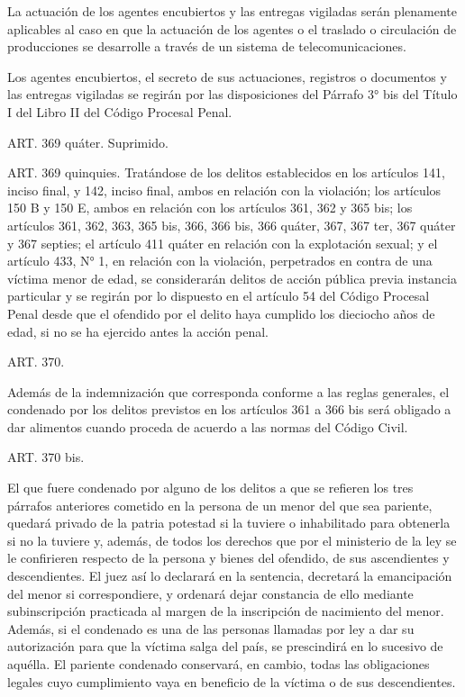     La actuación de los agentes encubiertos y las entregas vigiladas serán plenamente aplicables al caso en que la actuación de los agentes o el traslado o circulación de producciones se desarrolle a través de un sistema de telecomunicaciones.

    Los agentes encubiertos, el secreto de sus actuaciones, registros o documentos y las entregas vigiladas se regirán por las disposiciones del Párrafo 3° bis del Título I del Libro II del Código Procesal Penal.

    ART. 369 quáter. Suprimido.


    ART. 369 quinquies.
    Tratándose de los delitos establecidos en los artículos 141, inciso final, y 142, inciso final, ambos en relación con la violación; los artículos 150 B y 150 E, ambos en relación con los artículos 361, 362 y 365 bis; los artículos 361, 362, 363, 365 bis, 366, 366 bis, 366 quáter, 367, 367 ter, 367 quáter y 367 septies; el artículo 411 quáter en relación con la explotación sexual; y el artículo 433, N° 1, en relación con la violación, perpetrados en contra de una víctima menor de edad, se considerarán delitos de acción pública previa instancia particular y se regirán por lo dispuesto en el artículo 54 del Código Procesal Penal desde que el ofendido por el delito haya cumplido los dieciocho años de edad, si no se ha ejercido antes la acción penal.

    ART. 370.

    Además de la indemnización que corresponda conforme a las reglas generales, el condenado por los delitos previstos en los artículos 361 a 366 bis será obligado a dar alimentos cuando proceda de acuerdo a las normas del Código Civil.

    ART. 370 bis.

    El que fuere condenado por alguno de los delitos a que se refieren los tres párrafos anteriores cometido en la persona de un menor del que sea pariente, quedará privado de la patria potestad si la tuviere o inhabilitado para obtenerla si no la tuviere y, además, de todos los derechos que por el ministerio de la ley se le confirieren respecto de la persona y bienes del ofendido, de sus ascendientes y descendientes. El juez así lo declarará en la sentencia, decretará la emancipación del menor si correspondiere, y ordenará dejar constancia de ello mediante subinscripción practicada al margen de la inscripción de nacimiento del menor. Además, si el condenado es una de las personas llamadas por ley a dar su autorización para que la víctima salga del país, se prescindirá en lo sucesivo de aquélla.
    El pariente condenado conservará, en cambio, todas las obligaciones legales cuyo cumplimiento vaya en beneficio de la víctima o de sus descendientes.





